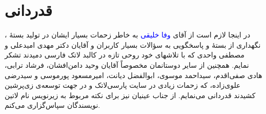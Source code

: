 \documentclass[a4paper]{article}
\theoremstyle{plain}\newtheorem{question}{پرسش}
\begin{document}
\section*{قدردانی}
در اینجا لازم است از آقای \textcolor{blue}{وفا خلیقی} به خاطر زحمات بسیار ایشان در تولید بستهٔ \XePersian، نگهداری از بستهٔ  و پاسخگویی به سؤالات بسیار کاربران و آقایان دکتر مهدی امیدعلی و مصطفی واحدی  که با تلاشهای خود روحی تازه در کالبد لاتک فارسی دمیدند تشکر نمایم. همچنین از سایر دوستانمان مخصوصاً آقایان  وحید دامن‌افشان، فرشاد ترابی، هادی صفی‌اقدم، سیداحمد موسوی، ابوالفضل دیانت، امیرمسعود پورموسی و سیدرضی علوی‌زاده،  که زحمات زیادی در سایت پارسی‌لاتک و در جهت توسعه‌ی زی‌پرشین کشیدند قدردانی می‌نمایم. از جناب عینیان نیز برای نکته مربوط به زیرنویس نام لاتین نویسندگان سپاس‌گزاری می‌کنم.


\end{document}
